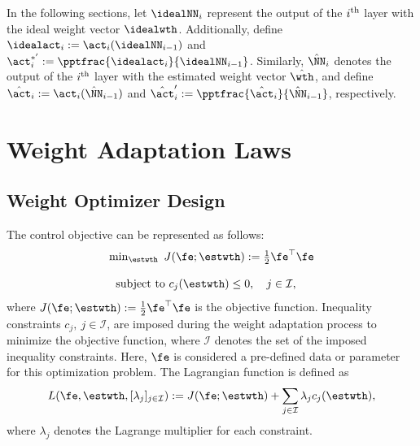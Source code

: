 \documentclass[final,5p,times,twocolumn,authoryear]{elsarticle}
\begin{document}
In the following sections, let $\idealNN_i$ represent the output of the $i\textsuperscript{th}$ layer with the ideal weight vector $\idealwth$. 
Additionally, define $\idealact_i:=\act_i(\idealNN_{i-1})$ and $\act^{*'}_i:= \pptfrac{\idealact_i}{\idealNN_{i-1}}$. 
Similarly, $\hat\NN_i$ denotes the output of the $i\textsuperscript{th}$ layer with the estimated weight vector $\hat \wth$, and define $\hat\act_i:=\act_i(\hat\NN_{i-1})$ and $\hat\act_i':= \pptfrac{\hat\act_i}{\hat\NN_{i-1}}$, respectively.

\section{Weight Adaptation Laws}\label{sec:adap_laws}

\subsection{Weight Optimizer Design}\label{sec:sub:weight optimizer}

The control objective can be represented as follows:
\begin{equation}
    \begin{matrix}
        \min_{\estwth} \ J(\fe;\estwth):= 
        \tfrac{1}{2} \fe^\top \fe
        \\ \\
        \begin{aligned}
        \text{subject to }&c_{j}(\estwth) 
        \le0, \quad j\in\mathcal{I},
        \end{aligned}
    \end{matrix}
    \label{eq:opt:problem1}
\end{equation}
where $J(\fe;\estwth):= \tfrac{1}{2} \fe^\top \fe$ is the objective function.
Inequality constraints $c_j,\ j\in\mathcal{I}$, are imposed during the weight adaptation process to minimize the objective function, where $\mathcal I$ denotes the set of the imposed inequality constraints. 
Here, $\fe$ is considered a pre-defined data or parameter for this optimization problem. The Lagrangian function is defined as
\begin{equation}
    L(
        \fe,\estwth,[\lambda_j]_{j\in\mathcal I}
    ) 
    := 
    J(\fe;\estwth) 
    + 
    \sum_{j\in\mathcal I}
    \lambda_{j}
    c_{j}(\estwth)
    ,
    \label{eq:lagrangian}
\end{equation}
where $\lambda_j$ denotes the Lagrange multiplier for each constraint.
\end{document}
